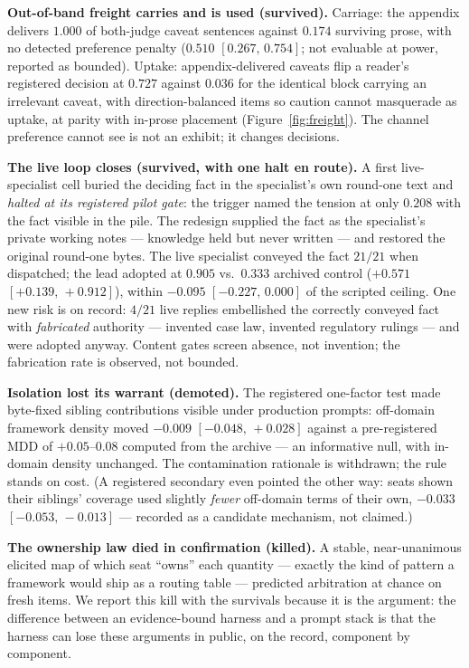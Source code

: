 \documentclass[11pt]{article}
\newcommand{\ci}[2]{\ensuremath{[#1,\,#2]}}
\begin{document}
\textbf{Out-of-band freight carries and is used (survived).} Carriage:
the appendix delivers $1.000$ of both-judge caveat sentences against
$0.174$ surviving prose, with no detected preference penalty ($0.510$
\ci{0.267}{0.754}; not evaluable at power, reported as bounded).
Uptake: appendix-delivered caveats flip a reader's registered decision
at $0.727$ against $0.036$ for the identical block carrying an
irrelevant caveat, with direction-balanced items so caution cannot
masquerade as uptake, at parity with in-prose placement
(Figure~\ref{fig:freight}). The channel preference cannot see is not
an exhibit; it changes decisions.

\textbf{The live loop closes (survived, with one halt en route).} A
first live-specialist cell buried the deciding fact in the
specialist's own round-one text and \emph{halted at its registered
pilot gate}: the trigger named the tension at only $0.208$ with the
fact visible in the pile. The redesign supplied the fact as the
specialist's private working notes --- knowledge held but never
written --- and restored the original round-one bytes. The live
specialist conveyed the fact $21/21$ when dispatched; the lead adopted
at $0.905$ vs.\ $0.333$ archived control ($+0.571$
\ci{+0.139}{+0.912}), within $-0.095$ \ci{-0.227}{0.000} of the
scripted ceiling. One new risk is on record: $4/21$ live replies
embellished the correctly conveyed fact with \emph{fabricated}
authority --- invented case law, invented regulatory rulings --- and
were adopted anyway. Content gates screen absence, not invention; the
fabrication rate is observed, not bounded.

\textbf{Isolation lost its warrant (demoted).} The registered
one-factor test made byte-fixed sibling contributions visible under
production prompts: off-domain framework density moved $-0.009$
\ci{-0.048}{+0.028} against a pre-registered MDD of $+0.05$--$0.08$
computed from the archive --- an informative null, with in-domain
density unchanged. The contamination rationale is withdrawn; the rule
stands on cost. (A registered secondary even pointed the other way:
seats shown their siblings' coverage used slightly \emph{fewer}
off-domain terms of their own, $-0.033$ \ci{-0.053}{-0.013} ---
recorded as a candidate mechanism, not claimed.)

\textbf{The ownership law died in confirmation (killed).} A stable,
near-unanimous elicited map of which seat ``owns'' each quantity ---
exactly the kind of pattern a framework would ship as a routing table
--- predicted arbitration at chance on fresh items. We report this
kill with the survivals because it is the argument: the difference
between an evidence-bound harness and a prompt stack is that the
harness can lose these arguments in public, on the record, component
by component.
\end{document}
